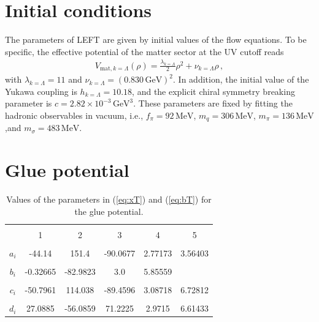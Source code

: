 \documentclass[%
reprint,
superscriptaddress,
showpacs,preprintnumbers,
amsmath,amssymb,
aps,
prd,
]{revtex4-1}
\def\eq#1{(\ref{#1})}
\begin{document}
	\section{Initial conditions}
	\label{app:Ini}
	
	The parameters of LEFT are given by initial values of the flow equations. To be specific, the effective potential of the matter sector at the UV cutoff reads
	\begin{align}
		V_{\mathrm{mat}, k=\Lambda}(\rho)=\frac{\lambda_{k=\Lambda}}{2}\rho^2+\nu_{k=\Lambda}\rho\,,
	\end{align}
	with $\lambda_{k=\Lambda}=11$ and $\nu_{k=\Lambda}=(0.830\,\mathrm{GeV})^2$. In addition, the initial value of the Yukawa coupling is $h_{k=\Lambda}=10.18$, and the explicit chiral symmetry breaking parameter is $c=2.82\times 10^{-3}\,\mathrm{GeV}^3$. These parameters are fixed by fitting the hadronic observables in vacuum, i.e., $f_\pi=92\,\mathrm{MeV}$, $m_q=306\,\mathrm{MeV}$, $m_\pi=136\,\mathrm{MeV}$,and $m_\sigma=483\,\mathrm{MeV}$.
	
	\section{Glue potential}
	\label{app:gluepot}
	
		
	\begin{table}[t]
		\begin{center}
			\begin{tabular}{|c||c|c|c|c|c|}
				\hline & & & & &  \\[-2ex]
				\hline & & & & & \\[-1ex]
				& 1 & 2 & 3 & 4 & 5 \\[1ex]
				\hline & & & & &  \\[-2ex]
				$a_i$ &-44.14& 151.4 & -90.0677 &2.77173 &3.56403 \\[1ex]
				\hline & & & & &  \\[-2ex]
				$b_i$ &-0.32665 &-82.9823 &3.0 &5.85559  &              \\[1ex]
				\hline & & & & &  \\[-2ex]
				$c_i$ &-50.7961 &114.038 &-89.4596 &3.08718 &6.72812 \\[1ex]
				\hline & & & & &  \\[-2ex]
				$d_i$ & 27.0885 &-56.0859 &71.2225 &2.9715 &6.61433 \\[1ex]
				\hline
			\end{tabular}
			\caption{Values of the parameters in \eq{eq:xT} and \eq{eq:bT} for the glue potential.}
			\label{tab:gluepotCoeffs}
		\end{center}\vspace{-0.5cm}
	\end{table}
	
\end{document}

